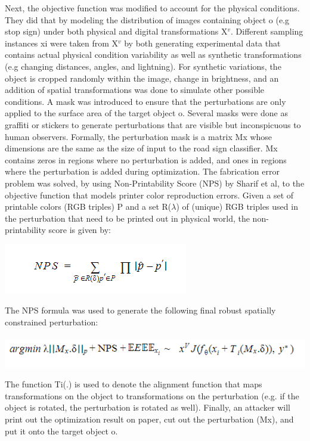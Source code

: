 \documentclass[sigconf, nonacm]{acmart}
\begin{document}
Next, the objective function was modified to account for the physical conditions. They did that by modeling  the distribution of images containing object o (e.g stop sign) under both physical and digital transformations X$^v$. Different sampling instances xi were taken from X$^v$ by both generating experimental data that contains actual physical condition variability as well as synthetic transformations (e.g changing distances, angles, and lightning). For synthetic variations, the object is cropped randomly within the image, change in brightness, and an addition of spatial transformations was done to simulate other possible conditions. A mask was introduced to ensure that the perturbations are only applied to the surface area of the target object o. Several masks were done as graffiti or stickers  to generate perturbations that are visible but inconspicuous to human observers. Formally, the perturbation mask is a matrix Mx whose dimensions are the same as the size of input to the road sign classifier. Mx contains zeros in regions where no perturbation is added, and ones in regions where the perturbation is added during optimization.
The fabrication error problem was solved, by using Non-Printability Score (NPS) by Sharif et al, to the objective function that models printer color reproduction errors. Given a set of printable colors (RGB triples) P and a set R($\lambda$) of (unique) RGB triples used in the perturbation that need to be printed out in physical world, the non-printability score is given by:

\includegraphics[scale=0.60]{file2.png}

The NPS formula was used to generate the following final robust spatially constrained perturbation: 
\\
\\

\includegraphics[scale=0.60]{file3.png}

The function Ti(.) is used to denote the alignment function that maps transformations on the object to transformations on the perturbation (e.g. if the object is rotated, the perturbation is rotated as well). Finally, an attacker will print out the optimization result on paper, cut out the perturbation (Mx), and put it onto the target object o.
\end{document}
